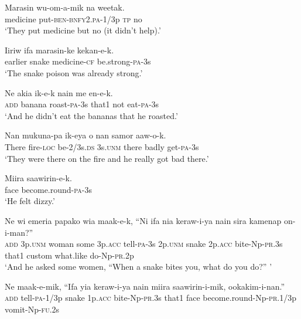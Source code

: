 {\ea\label{ex:a:x14}
\gll  Marasin  wu-om-a-mik  na  weetak. \\
medicine  put-\textsc{ben}-\textsc{bnfy}2.\textsc{pa}-1/3p  \textsc{tp}  no \\
\glt ‘They put medicine but no (it didn’t help).’ \\
\z


\ea\label{ex:a:x15}
\gll  Iiriw  ifa  marasin-ke  kekan-e-k. \\
earlier  snake  medicine-\textsc{cf}  be.strong-\textsc{pa}-3s \\
\glt ‘The snake poison was already strong.’ \\
\z


\ea\label{ex:a:x16}
\gll  Ne  akia  ik-e-k  nain  me  en-e-k. \\
\textsc{add}  banana  roast-\textsc{pa}-3s  that1  not  eat-\textsc{pa}-3s \\
\glt ‘And he didn’t eat the bananas that he roasted.’ \\
\z


\ea\label{ex:a:x17}
\gll  Nan  mukuna-pa  ik-eya  o  nan  samor  aaw-o-k. \\
There  fire-\textsc{loc}  be-2/3s.\textsc{ds}  3s.\textsc{unm}  there  badly  get-\textsc{pa}-3s \\
\glt ‘They were there on the fire and he really got bad there.’ \\
\z


\ea\label{ex:a:x18}
\gll  Miira  saawirin-e-k. \\
face  become.round-\textsc{pa}-3s \\
\glt ‘He felt dizzy.’ \\
\z


\ea\label{ex:a:x19}
\gll  Ne  wi  emeria  papako  wia  maak-e-k,  “Ni  ifa       nia  keraw-i-ya  nain  sira  kamenap  on-i-man?” \\
\textsc{add}  3p.\textsc{unm}  woman  some  3p.\textsc{acc}  tell-\textsc{pa}-3s  2p.\textsc{unm}  snake  2p.\textsc{acc}  bite-Np-\textsc{pr}.3s  that1  custom  what.like  do-Np-\textsc{pr}.2p \\


\glt ‘And he asked some women, “When a snake bites you, what do you do?” ’ \\
\z


\ea\label{ex:a:x20}
\gll  Ne  maak-e-mik,  “Ifa  yia  keraw-i-ya  nain      miira  saawirin-i-mik,  ookakim-i-nan.” \\
\textsc{add}  tell-\textsc{pa}-1/3p  snake  1p.\textsc{acc}  bite-Np-\textsc{pr}.3s  that1  face  become.round-Np-\textsc{pr}.1/3p  vomit-Np-\textsc{fu}.2s \\


}
